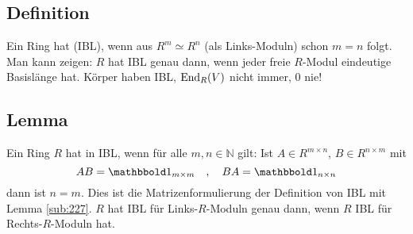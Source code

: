 \subsection[Definition: Invariante Basislänge (IBL)]{Definition} %
\label{sub:239}
Ein Ring hat  (IBL), wenn aus $R^m \simeq R^n$ (als Links-Moduln) schon $m=n$ folgt.
Man kann zeigen: $R$ hat IBL genau dann, wenn jeder freie $R$-Modul eindeutige Basislänge hat.
Körper haben IBL, $\operatorname{End}_R(V)$ nicht immer, $0$ nie!

\subsection[Lemma: Charakterisierung von IBL mit Matrizen]{Lemma} %
\label{sub:240}
Ein Ring $R$ hat in IBL, wenn für alle $m,n \in \mathds{N}$ gilt: Ist $A \in R^{m \times n}$, $B \in R^{n \times m}$ mit 
\[
	AB = \ind_{m \times m}\quad , 	\quad  BA= \ind_{n \times n} 
\]
dann ist $n=m$.
Dies ist die Matrizenformulierung der Definition von IBL mit Lemma \ref{sub:227}. \bewende
{}
$R$ hat IBL für Links-$R$-Moduln genau dann, wenn $R$ IBL für Rechts-$R$-Moduln hat.

